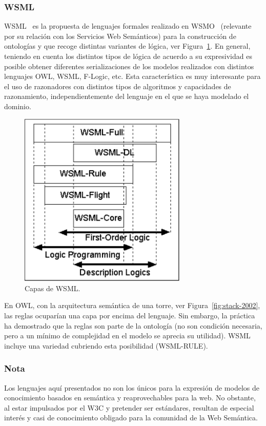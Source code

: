 \subsubsection{WSML}
\gls{WSML}~\cite{WSML2006} es la propuesta de lenguajes formales realizado en \gls{WSMO}~\cite{WSMODeri} 
(relevante por su relación con los Servicios Web Semánticos) para la construcción de ontologías y que recoge 
distintas variantes de lógica, ver Figura~\ref{fig:wsml-layering}. En general, teniendo en cuenta los
distintos tipos de lógica de acuerdo a su expresividad es posible obtener diferentes serializaciones
de los modelos realizados con distintos lenguajes \gls{OWL}, WSML, F-Logic, etc. Esta característica
es muy interesante para el uso de razonadores con distintos tipos de algoritmos y capacidades de
razonamiento, independientemente del lenguaje en el que se haya modelado el dominio.

\begin{figure}[htb]
\centering
	\includegraphics[width=8cm]{images/wsml-layering}
\caption{Capas de WSML.}
\label{fig:wsml-layering}
\end{figure}

\begin{note}
En OWL, con la arquitectura semántica de una torre, ver Figura~\ref{fig:stack-2002}, las
reglas ocuparían una capa por encima del lenguaje. Sin embargo, la práctica ha demostrado que la reglas son
parte de la ontología (no son condición necesaria, pero a un mínimo de complejidad en el
modelo se aprecia su utilidad). WSML incluye una variedad cubriendo esta
posibilidad (WSML-RULE).
\end{note}


\subsubsection{Nota}
Los lenguajes aquí presentados no son los únicos para la expresión de modelos de
conocimiento basados en semántica y reaprovechables para la web. No obstante,
al estar impulsados por el \gls{W3C} y pretender ser estándares, resultan de especial
interés y casi de conocimiento obligado para la comunidad de la Web Semántica.

